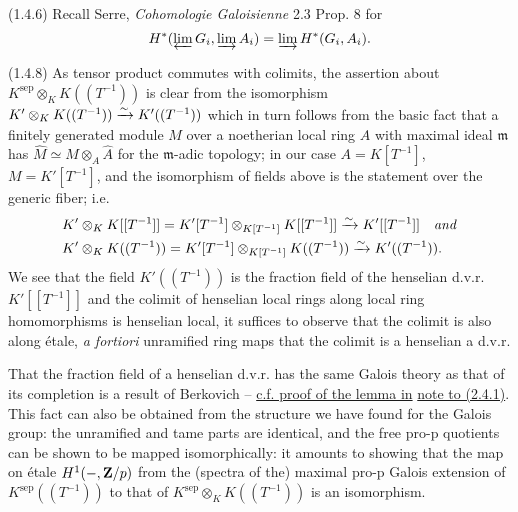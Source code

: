\documentclass[deligne.tex]{subfiles}
\begin{document}
(1.4.6) Recall Serre, \emph{Cohomologie Galoisienne} 2.3 Prop. 8 for
\begin{equation*}
	H^*(\varprojlim G_i,\varinjlim A_i)=\varinjlim H^*(G_i,A_i).
\end{equation*}

(1.4.8) As tensor product commutes with colimits, the assertion about
$K^{\mathrm{sep}}\otimes_K K((T^{-1}))$ is clear from the isomorphism
$K'\otimes_K K((T^{-1}))\xrightarrow\sim K'((T^{-1}))$ which in turn follows from 
the basic fact that a finitely generated module $M$ over a noetherian local
ring $A$ with maximal ideal $\mathfrak m$ has
$\hat M\simeq M\otimes_A\hat A$ for the $\mathfrak m$-adic topology; in our
case $A=K[T^{-1}]$, $M=K'[T^{-1}]$, and the isomorphism of fields above is
the statement over the generic fiber; i.e.
\begin{align*}
	&K'\otimes_K K[[T^{-1}]]=K'[T^{-1}]\otimes_{K[T^{-1}]}K[[T^{-1}]] \xrightarrow\sim K'[[T^{-1}]]\quad\text{\emph{and}} \\
	&K'\otimes_K K((T^{-1}))=K'[T^{-1}]\otimes_{K[T^{-1}]}K((T^{-1}))\xrightarrow\sim K'((T^{-1})).
\end{align*}
We see that the field $K'((T^{-1}))$ is the fraction field of the
henselian d.v.r. $K'[[T^{-1}]]$ and the colimit of henselian local rings
along local ring homomorphisms is henselian local, it suffices to observe
that the colimit is also along étale, \emph{a fortiori} unramified ring
maps that the colimit is a henselian a d.v.r.

That the fraction field of a henselian d.v.r. has the same Galois
theory as that of its completion is a result of Berkovich
– \hyperref[pf:berkovich_lemma]{c.f. proof of the lemma in}
\hyperref[laumon:2.4.1]{note to (2.4.1)}.
This fact can also be obtained from the structure we have found for the
Galois group: the unramified and tame parts are identical, and the free
pro-p quotients can be shown to be mapped isomorphically: it amounts to
showing that the map on étale $H^1(-,\mathbf{Z}/p)$ from the (spectra of the)
maximal pro-p Galois extension of $K^{\mathrm{sep}}((T^{-1}))$ to that of $K^{\mathrm{sep}}\otimes_K K((T^{-1}))$ is an isomorphism.
\end{document}
